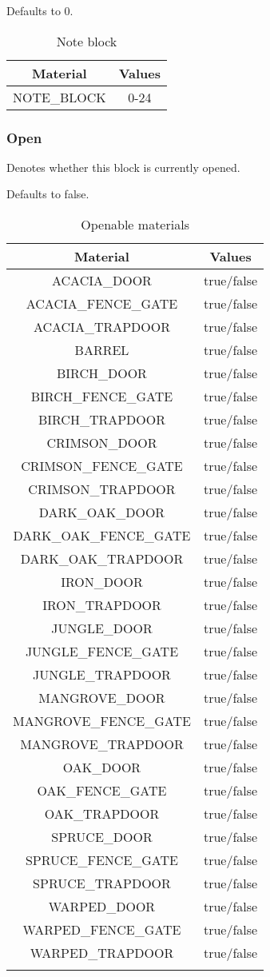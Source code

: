 Defaults to 0.

\begin{table}[H]
	\centering
	\begin{tabular}{ |c|c| }
		\hline
		Material & Values \\
		\hline
		NOTE\_BLOCK & 0-24 \\
		\hline
	\end{tabular}
	\caption{Note block}
\end{table}

\subsubsection{Open}\label{spigot-types:open}
Denotes whether this block is currently opened.

Defaults to false.

\begin{longtable}{ |c|c| }
	\hline
	Material & Values \\
	\hline
	\endhead
	ACACIA\_DOOR & true/false \\
	ACACIA\_FENCE\_GATE & true/false \\
	ACACIA\_TRAPDOOR & true/false \\
	BARREL & true/false \\
	BIRCH\_DOOR & true/false \\
	BIRCH\_FENCE\_GATE & true/false \\
	BIRCH\_TRAPDOOR & true/false \\
	CRIMSON\_DOOR & true/false \\
	CRIMSON\_FENCE\_GATE & true/false \\
	CRIMSON\_TRAPDOOR & true/false \\
	DARK\_OAK\_DOOR & true/false \\
	DARK\_OAK\_FENCE\_GATE & true/false \\
	DARK\_OAK\_TRAPDOOR & true/false \\
	IRON\_DOOR & true/false \\
	IRON\_TRAPDOOR & true/false \\
	JUNGLE\_DOOR & true/false \\
	JUNGLE\_FENCE\_GATE & true/false \\
	JUNGLE\_TRAPDOOR & true/false \\
	MANGROVE\_DOOR & true/false \\
	MANGROVE\_FENCE\_GATE & true/false \\
	MANGROVE\_TRAPDOOR & true/false \\
	OAK\_DOOR & true/false \\
	OAK\_FENCE\_GATE & true/false \\
	OAK\_TRAPDOOR & true/false \\
	SPRUCE\_DOOR & true/false \\
	SPRUCE\_FENCE\_GATE & true/false \\
	SPRUCE\_TRAPDOOR & true/false \\
	WARPED\_DOOR & true/false \\
	WARPED\_FENCE\_GATE & true/false \\
	WARPED\_TRAPDOOR & true/false \\
	\hline
	\caption{Openable materials}
\end{longtable}

